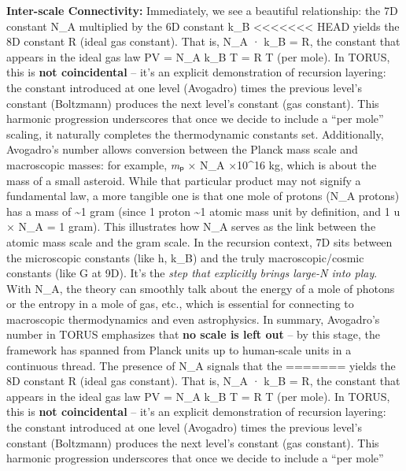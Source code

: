 \documentclass[]{article}
\begin{document}
\textbf{Inter-scale Connectivity:} Immediately, we see a beautiful
relationship: the 7D constant N\_A multiplied by the 6D constant k\_B
<<<<<<< HEAD
yields the 8D constant R (ideal gas constant)\hspace{0pt}. That is, N\_A
· k\_B = R, the constant that appears in the ideal gas law PV = N\_A
k\_B T = R T (per mole). In TORUS, this is \textbf{not coincidental} --
it's an explicit demonstration of recursion layering: the constant
introduced at one level (Avogadro) times the previous level's constant
(Boltzmann) produces the next level's constant (gas
constant)\hspace{0pt}. This harmonic progression underscores that once
we decide to include a ``per mole'' scaling, it naturally completes the
thermodynamic constants set. Additionally, Avogadro's number allows
conversion between the Planck mass scale and macroscopic masses: for
example, \emph{m}ₚ × N\_A ×10\^{}16 kg\hspace{0pt}, which is about
the mass of a small asteroid. While that particular product may not
signify a fundamental law, a more tangible one is that one mole of
protons (N\_A protons) has a mass of \textasciitilde1 gram (since 1
proton \textasciitilde1 atomic mass unit by definition, and 1 u × N\_A =
1 gram). This illustrates how N\_A serves as the link between the atomic
mass scale and the gram scale\hspace{0pt}. In the recursion context, 7D
sits between the microscopic constants (like h, k\_B) and the truly
macroscopic/cosmic constants (like G at 9D). It's the \emph{step that
explicitly brings large-N into play}. With N\_A, the theory can smoothly
talk about the energy of a mole of photons or the entropy in a mole of
gas, etc., which is essential for connecting to macroscopic
thermodynamics and even astrophysics. In summary, Avogadro's number in
TORUS emphasizes that \textbf{no scale is left out} -- by this stage,
the framework has spanned from Planck units up to human-scale units in a
continuous thread\hspace{0pt}. The presence of N\_A signals that the
=======
yields the 8D constant R (ideal gas constant)​. That is, N\_A · k\_B =
R, the constant that appears in the ideal gas law PV = N\_A k\_B T = R T
(per mole). In TORUS, this is \textbf{not coincidental} -- it's an
explicit demonstration of recursion layering: the constant introduced at
one level (Avogadro) times the previous level's constant (Boltzmann)
produces the next level's constant (gas constant)​. This harmonic
progression underscores that once we decide to include a ``per mole''
\end{document}
